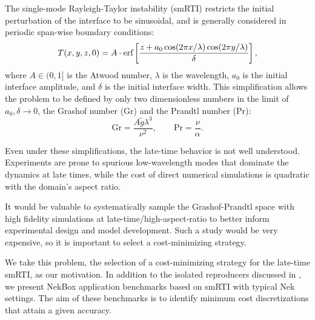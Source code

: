 The single-mode Rayleigh-Taylor instability (smRTI) restricts the initial perturbation of the interface to be sinusoidal, and is generally considered in periodic span-wise boundary conditions:
\begin{equation} \elabel{IC}
T(x,y,z,0) = A\cdot \text{erf}\left[\frac{z + a_0 \cos(2 \pi x/\lambda) \cos(2 \pi y/\lambda)}{\delta}\right],
\end{equation}
where $A \in (0,1]$ is the Atwood number,
$\lambda$ is the wavelength, 
$a_0$ is the initial interface amplitude, and
$\delta$ is the initial interface width.
This simplification allows the problem to be defined by only two dimensionless numbers in the limit of $a_0, \delta \rightarrow 0$, the Grashof number (Gr) and the Prandtl number (Pr):
\begin{equation}
\text{Gr} = \frac{A \tilde{g} \lambda^3}{\nu^2},  \qquad \text{Pr} = \frac{\nu}{\alpha}.
\end{equation}

Even under these simplifications, the late-time behavior is not well understood.
Experiments are prone to spurious low-wavelength modes that dominate the dynamics at late times, while the cost of direct numerical simulations is quadratic with the domain's aspect ratio.

It would be valuable to systematically sample the Grashof-Prandtl space with high fidelity simulations at late-time/high-aspect-ratio to better inform experimental design and model development.
Such a study would be very expensive, so it is important to select a cost-minimizing strategy.

We take this problem, the selection of a cost-minimizing strategy for the late-time smRTI, as our motivation.
In addition to the isolated reproducers discussed in , we present NekBox application benchmarks based on smRTI with typical Nek settings.
The aim of these benchmarks is to identify minimum cost discretizations that attain a given accuracy.

